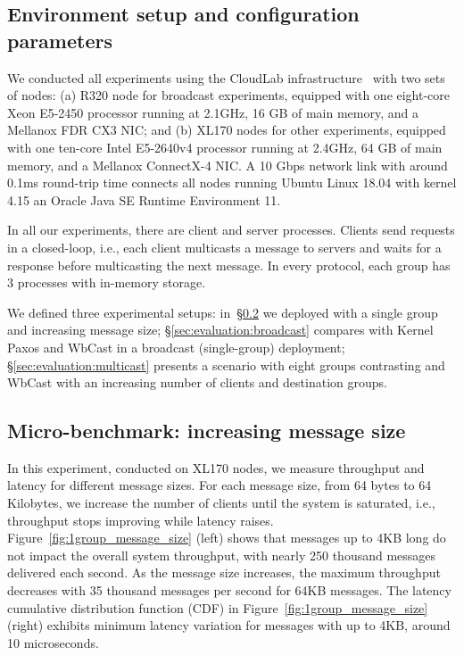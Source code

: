 \subsection{Environment setup and configuration parameters}
\label{sec:evaluation:setup}

We conducted all experiments using the CloudLab infrastructure~\cite{DuplyakinATC19cloudlab} with two sets of nodes: 
(a) R320 node for broadcast experiments, equipped with one eight-core Xeon E5-2450 processor running at 2.1GHz, 16 GB of main memory, and a Mellanox FDR CX3 NIC; and (b) XL170 nodes for other experiments, equipped with one ten-core Intel E5-2640v4 processor running at 2.4GHz, 64 GB of main memory, and a Mellanox ConnectX-4 NIC. 
A 10 Gbps network link with around 0.1ms round-trip time connects all nodes running Ubuntu Linux 18.04 with kernel 4.15 an Oracle Java SE Runtime Environment 11. 

In all our experiments, there are client and server processes. 
Clients send requests in a closed-loop, i.e., each client multicasts a message to servers and waits for a response before multicasting the next message. 
In every protocol, each group has 3 processes with in-memory storage.

We defined three experimental setups:
in~\S\ref{sec:evaluation:micro} we deployed \libname with a single group and increasing message size;
\S\ref{sec:evaluation:broadcast} compares \libname with Kernel Paxos and WbCast in a broadcast (single-group) deployment;
\S\ref{sec:evaluation:multicast} presents a scenario with eight groups contrasting \libname and WbCast with an increasing number of clients and destination groups.

\subsection{Micro-benchmark: increasing message size}
\label{sec:evaluation:micro}
In this experiment, conducted on XL170 nodes, we measure \libname throughput and latency for different message sizes.
For each message size, from 64 bytes to 64 Kilobytes, we increase the number of clients until the system is saturated, i.e., throughput stops improving while latency raises.
Figure~\ref{fig:1group_message_size} (left) shows that messages up to 4KB long do not impact the overall system throughput, with nearly 250 thousand messages delivered each second. 
As the message size increases, the maximum throughput decreases with 35 thousand messages per second for 64KB messages.
The latency cumulative distribution function (CDF) in Figure~\ref{fig:1group_message_size} (right) exhibits minimum latency variation for messages with up to 4KB, around 10 microseconds.

